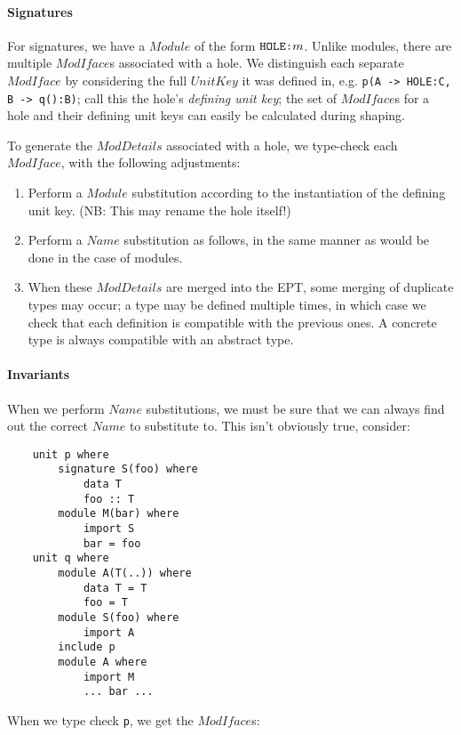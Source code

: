 \documentclass{article}
\newcommand{\I}[1]{\ensuremath{\mathit{#1}}}
\begin{document}
\paragraph{Signatures}  For signatures, we have a \I{Module} of the form
$\verb|HOLE:|m$.  Unlike modules, there are multiple \I{ModIface}s associated with a hole.
We distinguish each separate \I{ModIface} by considering the full \I{UnitKey}
it was defined in, e.g. \verb|p(A -> HOLE:C, B -> q():B)|; call this
the hole's \emph{defining unit key}; the set of \I{ModIface}s for a hole
and their defining unit keys can easily be calculated during shaping.

To generate the \I{ModDetails} associated with a hole, we type-check each
\I{ModIface}, with the following adjustments:

\begin{enumerate}
    \item Perform a \I{Module} substitution according to the instantiation
        of the defining unit key.  (NB: This may rename the hole itself!)
    \item Perform a \I{Name} substitution as follows, in the same manner
        as would be done in the case of modules.
    \item When these \I{ModDetails} are merged into the EPT, some merging
        of duplicate types may occur; a type
        may be defined multiple times, in which case we check that each
        definition is compatible with the previous ones.  A concrete
        type is always compatible with an abstract type.
\end{enumerate}

\paragraph{Invariants} When we perform \I{Name} substitutions, we must be
sure that we can always find out the correct \I{Name} to substitute to.
This isn't obviously true, consider:

\begin{verbatim}
    unit p where
        signature S(foo) where
            data T
            foo :: T
        module M(bar) where
            import S
            bar = foo
    unit q where
        module A(T(..)) where
            data T = T
            foo = T
        module S(foo) where
            import A
        include p
        module A where
            import M
            ... bar ...
\end{verbatim}
%
When we type check \verb|p|, we get the \I{ModIface}s:
\end{document}
